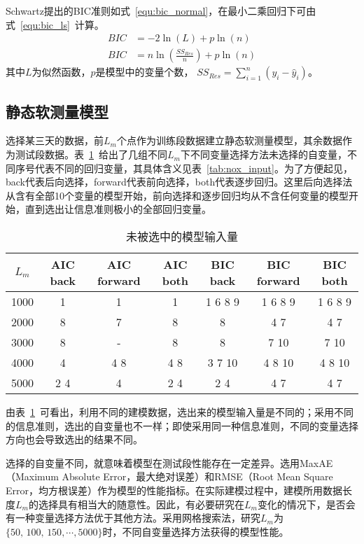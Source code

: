 Schwartz提出的BIC准则如式~\ref{equ:bic_normal}，在最小二乘回归下可由式~\ref{equ:bic_ls}~计算。
\begin{align}
BIC &= -2\ln (L) + p\ln(n) \label{equ:bic_normal}\\
BIC &= n\ln(\frac{SS_{Res}}{n})+p\ln(n) \label{equ:bic_ls}
\end{align}
其中$L$为似然函数，$p$是模型中的变量个数， $SS_{Res} = \sum_{i=1}^{n}(y_{i} - \hat{y}_{i})$。 
\subsection{静态软测量模型}
\label{chap:static_model}

选择某三天的数据，前$L_{m}$个点作为训练段数据建立静态软测量模型，其余数据作为测试段数据。表~\ref{tab:input_not_select}~给出了几组不同$L_{m}$下不同变量选择方法未选择的自变量，不同序号代表不同的回归变量，其具体含义见表~\ref{tab:nox_input}。为了方便起见，back代表后向选择，forward代表前向选择，both代表逐步回归。这里后向选择法从含有全部10个变量的模型开始，前向选择和逐步回归均从不含任何变量的模型开始，直到选出让信息准则极小的全部回归变量。
\begingroup
\renewcommand*{\arraystretch}{1.67}
\begin{table}[!h]
\small
\centering
\caption[未被选中的模型输入量]{未被选中的模型输入量} \label{tab:input_not_select}
\begin{tabular}{ccccccc}
\hline\hline 
$L_{m}$&	AIC back	&AIC forward	&AIC both	&BIC back	&BIC forward&	BIC both\\
\hline
1000	&1	&1&	1	&1 6 8 9	&1 6 8 9	&1 6 8 9\\
2000	&8	&7&	8	&8&	4 7	&4 7\\
3000	&8	&-	&8	&8	&7 10	&7 10\\
4000	&4	&4 8	&4 8	&3 7 10	&4 8 10	&4 8 10\\
5000	&2 4	&4	&2 4	&2 4	&4 7	&4 7\\
\hline\hline
\end{tabular}
\end{table}
\endgroup

由表~\ref{tab:input_not_select}~可看出，利用不同的建模数据，选出来的模型输入量是不同的；采用不同的信息准则，选出的自变量也不一样；即使采用同一种信息准则，不同的变量选择方向也会导致选出的结果不同。

选择的自变量不同，就意味着模型在测试段性能存在一定差异。选用MaxAE（Maximum Absolute Error，最大绝对误差）和RMSE（Root Mean Square Error，均方根误差）作为模型的性能指标。在实际建模过程中，建模所用数据长度$L_{m}$的选择具有相当大的随意性。因此，有必要研究在$L_{m}$变化的情况下，是否会有一种变量选择方法优于其他方法。采用网格搜索法，研究$L_{m}$为$\{\textrm{50},\,\textrm{100},\,\textrm{150},\cdots,\textrm{5000}\}$时，不同自变量选择方法获得的模型性能。

